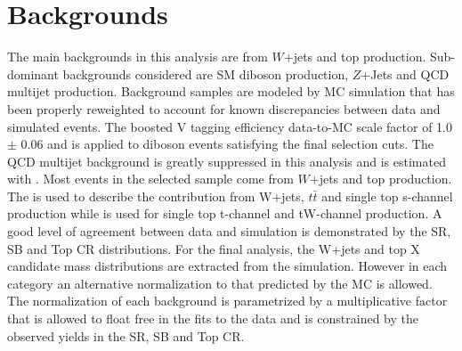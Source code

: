 \section{Backgrounds}
The main backgrounds in this analysis are from $W$+jets and top production. Sub-dominant
backgrounds considered are SM diboson production, $Z$+Jets and QCD multijet production.
Background samples are modeled by MC simulation that has been properly reweighted to
account for known discrepancies between data and simulated events.
The boosted V tagging efficiency data-to-MC scale factor of 1.0 $\pm$ 0.06 
and is applied to diboson events satisfying the final selection cuts. 
The QCD multijet background is greatly suppressed in this analysis and is estimated with \PYTHIA.
Most events in the selected sample come from $W$+jets and top production. 
The \MADGRAPH is used to describe the contribution from W+jets, $t \bar{t}$ and single top s-channel production
while \POWHEG is used for single top t-channel and tW-channel production. 
A good level of agreement between data and simulation is demonstrated by the SR, SB and Top CR distributions.
For the final analysis, the W+jets and top X candidate mass distributions  are extracted from the simulation. 
However in each category an alternative normalization to that predicted by the MC is allowed. 
The normalization of each background is parametrized by a
multiplicative factor that is allowed to float free in the fits to the data and is constrained by the
observed yields in the SR, SB and Top CR.

